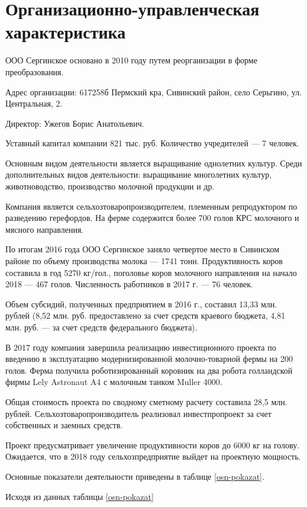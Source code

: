 \section{Организационно-управленческая характеристика}

ООО Сергинское основано в 2010 году путем реорганизации в форме преобразования. 

Адрес организации: 617258б Пермский кра, Сивинский район, село Серьгино, ул. Центральная, 2.

Директор: Ужегов Борис Анатольевич.

Уставный капитал компании 821 тыс. руб. Количество учредителей --- 7 человек.

Основным видом деятельности является выращивание однолетних культур. Среди дополнительных видов деятельности:  выращивание многолетних культур, животноводство, производство молочной продукции и др.

Компания является сельхозтоваропроизводителем, племенным репродуктором по разведению герефордов. На ферме содержится более 700 голов КРС молочного и мясного направления. 

По итогам 2016 года ООО Сергинское заняло четвертое место в Сивинском районе по объему производства молока --- 1741 тонн. Продуктивность коров составила в год 5270 кг/гол., поголовье коров молочного направления на начало 2018 --- 467 голов. Численность работников в 2017 г. --- 76 человек.

Объем субсидий, полученных предприятием в 2016 г., составил 13,33 млн. рублей (8,52 млн. руб. предоставлено за счет средств краевого бюджета, 4,81 млн. руб. --- за счет средств федерального бюджета).

В 2017 году компания завершила реализацию инвестиционного проекта по введению в эксплуатацию модернизированной молочно-товарной фермы на 200 голов. Ферма получила роботизированный коровник на два робота голландской фирмы Lely Astronaut A4  с молочным танком Muller 4000.

Общая стоимость проекта по сводному сметному расчету составила 28,5 млн. рублей. Сельхозтоваропроизводитель реализовал инвестпропроект за счет собственных и заемных средств.

Проект предусматривает увеличение продуктивности коров до 6000 кг на голову. Ожидается, что в 2018 году сельхозпредприятие выйдет на проектную мощность.

Основные показатели деятельности приведены в таблице \ref{osn-pokazat}.

Исходя из данных таблицы \ref{osn-pokazat} 

